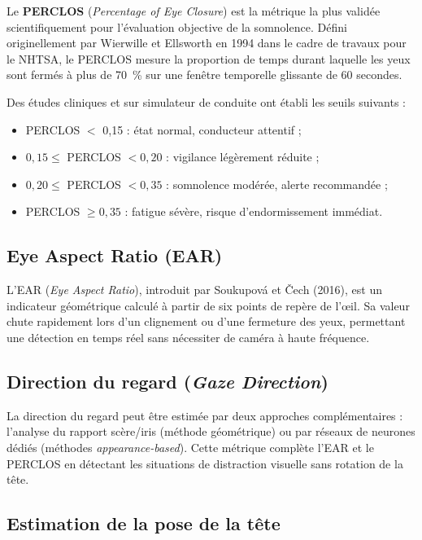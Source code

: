 \documentclass[12pt,a4paper]{report}
\begin{document}
Le \textbf{PERCLOS} (\textit{Percentage of Eye Closure}) est la m\'etrique la plus valid\'ee scientifiquement pour l'\'evaluation objective de la somnolence. D\'efini originellement par Wierwille et Ellsworth en 1994 dans le cadre de travaux pour le NHTSA, le PERCLOS mesure la proportion de temps durant laquelle les yeux sont ferm\'es \`a plus de 70~\% sur une fen\^etre temporelle glissante de 60 secondes.

Des \'etudes cliniques et sur simulateur de conduite ont \'etabli les seuils suivants :
\begin{itemize}
  \item PERCLOS $<$ 0,15 : \'etat normal, conducteur attentif ;
  \item $0{,}15 \leq$ PERCLOS $< 0{,}20$ : vigilance l\'eg\`erement r\'eduite ;
  \item $0{,}20 \leq$ PERCLOS $< 0{,}35$ : somnolence mod\'er\'ee, alerte recommand\'ee ;
  \item PERCLOS $\geq 0{,}35$ : fatigue s\'ev\`ere, risque d'endormissement imm\'ediat.
\end{itemize}

\subsection{Eye Aspect Ratio (EAR)}

L'EAR (\textit{Eye Aspect Ratio}), introduit par Soukupov\'a et \v{C}ech (2016), est un indicateur g\'eom\'etrique calcul\'e \`a partir de six points de rep\`ere de l'\oe il. Sa valeur chute rapidement lors d'un clignement ou d'une fermeture des yeux, permettant une d\'etection en temps r\'eel sans n\'ecessiter de cam\'era \`a haute fr\'equence.

\subsection{Direction du regard (\textit{Gaze Direction})}

La direction du regard peut \^etre estim\'ee par deux approches compl\'ementaires : l'analyse du rapport sc\`ere/iris (m\'ethode g\'eom\'etrique) ou par r\'eseaux de neurones d\'edi\'es (m\'ethodes \textit{appearance-based}). Cette m\'etrique compl\`ete l'EAR et le PERCLOS en d\'etectant les situations de distraction visuelle sans rotation de la t\^ete.

\subsection{Estimation de la pose de la t\^ete}
\end{document}
